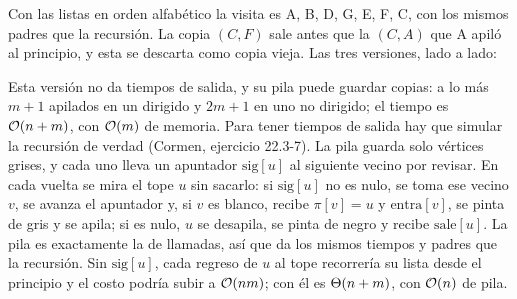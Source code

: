 \documentclass[11pt,letterpaper]{article}
\begin{document}
\begin{ejemplo}
  Con las listas en orden alfabético la visita es A, B, D, G, E, F, C,
  con los mismos padres que la recursión. La copia $(C, F)$ sale antes
  que la $(C, A)$ que A apiló al principio, y esta se descarta como
  copia vieja. Las tres versiones, lado a lado:
  \begin{center}
  \end{center}
\end{ejemplo}

Esta versión no da tiempos de salida, y su pila puede guardar copias:
a lo más $m + 1$ apilados en un dirigido y $2m + 1$ en uno no
dirigido; el tiempo es $\mathcal{O}\!\left(n + m\right)$, con $\mathcal{O}\!\left(m\right)$ de memoria. Para
tener tiempos de salida hay que simular la recursión de verdad
(Cormen, ejercicio 22.3-7). La pila guarda solo vértices grises, y
cada uno lleva un apuntador $\text{sig}[u]$ al siguiente vecino por
revisar. En cada vuelta se mira el tope $u$ sin sacarlo: si
$\text{sig}[u]$ no es nulo, se toma ese vecino $v$, se avanza el
apuntador y, si $v$ es blanco, recibe $\pi[v] = u$ y $\text{entra}[v]$,
se pinta de gris y se apila; si es nulo, $u$ se desapila, se pinta de
negro y recibe $\text{sale}[u]$. La pila es exactamente la de
llamadas, así que da los mismos tiempos y padres que la recursión. Sin
$\text{sig}[u]$, cada regreso de $u$ al tope recorrería su lista desde
el principio y el costo podría subir a $\mathcal{O}\!\left(nm\right)$; con él es
$\Theta\!\left(n + m\right)$, con $\mathcal{O}\!\left(n\right)$ de pila.
\end{document}
